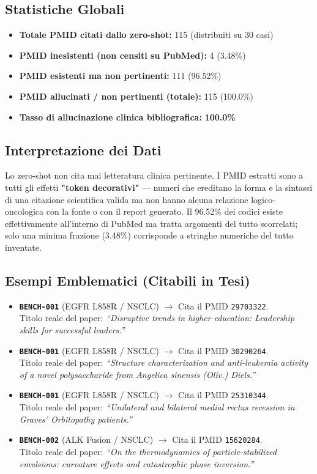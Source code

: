 \documentclass[12pt, a4paper]{article}
\newcommand{\pass}[1]{{\color{passgreen}\textbf{#1}}}
\newcommand{\bench}[1]{{\texttt{\textbf{#1}}}}
\begin{document}
\subsection{Statistiche Globali}
\begin{itemize}[leftmargin=1.6em, itemsep=2pt]
  \item \textbf{Totale PMID citati dallo zero-shot:} 115 (distribuiti su 30 casi)
  \item \textbf{PMID inesistenti (non censiti su PubMed):} 4 (3.48\%)
  \item \textbf{PMID esistenti ma non pertinenti:} 111 (96.52\%)
  \item \textbf{PMID allucinati / non pertinenti (totale):} 115 (100.0\%)
  \item \textbf{Tasso di allucinazione clinica bibliografica:} \pass{100.0\%}
\end{itemize}

\subsection{Interpretazione dei Dati}
Lo zero-shot non cita mai letteratura clinica pertinente. I PMID estratti sono a tutti gli effetti \textbf{"token decorativi"} --- numeri che ereditano la forma e la sintassi di una citazione scientifica valida ma non hanno alcuna relazione logico-oncologica con la fonte o con il report generato. Il 96.52\% dei codici esiste effettivamente all'interno di PubMed ma tratta argomenti del tutto scorrelati; solo una minima frazione (3.48\%) corrisponde a stringhe numeriche del tutto inventate.

\subsection{Esempi Emblematici (Citabili in Tesi)}
\begin{itemize}[leftmargin=1.6em, itemsep=3pt]
  \item \bench{BENCH-001} (EGFR L858R / NSCLC) $\rightarrow$ Cita il PMID \texttt{29703322}.\\
        Titolo reale del paper: \textit{``Disruptive trends in higher education: Leadership skills for successful leaders.''}
  \item \bench{BENCH-001} (EGFR L858R / NSCLC) $\rightarrow$ Cita il PMID \texttt{30290264}.\\
        Titolo reale del paper: \textit{``Structure characterization and anti-leukemia activity of a novel polysaccharide from Angelica sinensis (Oliv.) Diels.''}
  \item \bench{BENCH-001} (EGFR L858R / NSCLC) $\rightarrow$ Cita il PMID \texttt{25310344}.\\
        Titolo reale del paper: \textit{``Unilateral and bilateral medial rectus recession in Graves' Orbitopathy patients.''}
  \item \bench{BENCH-002} (ALK Fusion / NSCLC) $\rightarrow$ Cita il PMID \texttt{15620284}.\\
        Titolo reale del paper: \textit{``On the thermodynamics of particle-stabilized emulsions: curvature effects and catastrophic phase inversion.''}
  \end{itemize}
\end{document}
